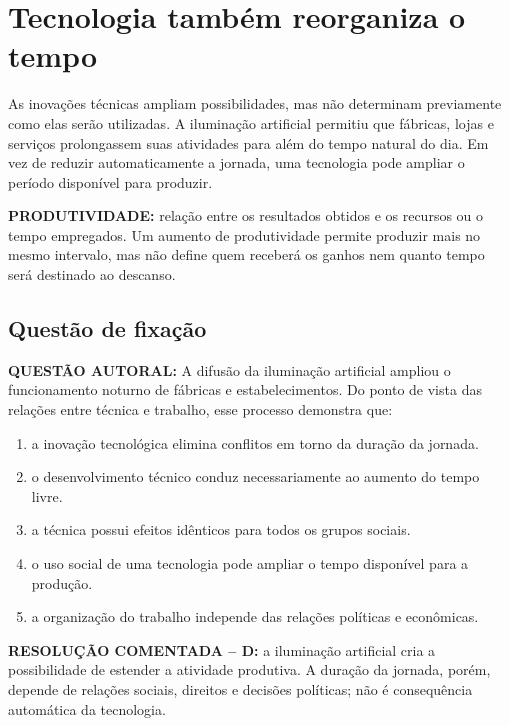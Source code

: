 \section{Tecnologia também reorganiza o tempo}

As inovações técnicas ampliam possibilidades, mas não determinam previamente como elas serão utilizadas. A iluminação artificial permitiu que fábricas, lojas e serviços prolongassem suas atividades para além do tempo natural do dia. Em vez de reduzir automaticamente a jornada, uma tecnologia pode ampliar o período disponível para produzir.

\begin{conceito}
\textbf{PRODUTIVIDADE:} relação entre os resultados obtidos e os recursos ou o tempo empregados. Um aumento de produtividade permite produzir mais no mesmo intervalo, mas não define quem receberá os ganhos nem quanto tempo será destinado ao descanso.
\end{conceito}

\subsection*{Questão de fixação}

\begin{questao}
\textbf{QUESTÃO AUTORAL:} A difusão da iluminação artificial ampliou o funcionamento noturno de fábricas e estabelecimentos. Do ponto de vista das relações entre técnica e trabalho, esse processo demonstra que:

\begin{enumerate}[label=\Alph*),leftmargin=2em]
  \item a inovação tecnológica elimina conflitos em torno da duração da jornada.
  \item o desenvolvimento técnico conduz necessariamente ao aumento do tempo livre.
  \item a técnica possui efeitos idênticos para todos os grupos sociais.
  \item o uso social de uma tecnologia pode ampliar o tempo disponível para a produção.
  \item a organização do trabalho independe das relações políticas e econômicas.
\end{enumerate}
\end{questao}

\begin{resolucao}
\textbf{RESOLUÇÃO COMENTADA -- D:} a iluminação artificial cria a possibilidade de estender a atividade produtiva. A duração da jornada, porém, depende de relações sociais, direitos e decisões políticas; não é consequência automática da tecnologia.
\end{resolucao}

